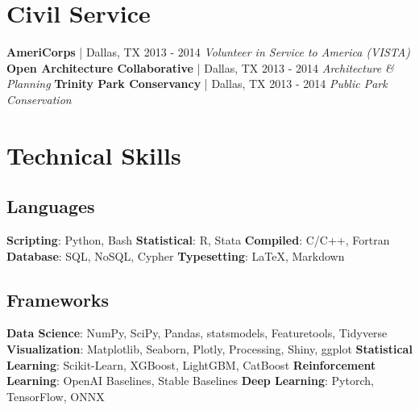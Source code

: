 \documentclass{article}
\begin{document}
    \section*{Civil Service}
        \textbf{AmeriCorps} | Dallas, TX \hfill{2013 - 2014}\newline
        \textit{Volunteer in Service to America (VISTA)}\newline\newline
        \textbf{Open Architecture Collaborative} | Dallas, TX \hfill{2013 - 2014}\newline
        \textit{Architecture \& Planning}\newline\newline
        \textbf{Trinity Park Conservancy} | Dallas, TX \hfill{2013 - 2014}\newline
        \textit{Public Park Conservation}
    \section*{Technical Skills}
    \subsection*{Languages}
        \textbf{Scripting}: Python, Bash\newline
        \textbf{Statistical}: R, Stata\newline
        \textbf{Compiled}: C/C++, Fortran\newline
        \textbf{Database}: SQL, NoSQL, Cypher\newline
        \textbf{Typesetting}: \LaTeX, Markdown
    \subsection*{Frameworks}
        \textbf{Data Science}: NumPy, SciPy, Pandas, statsmodels, Featuretools, Tidyverse\newline
        \textbf{Visualization}: Matplotlib, Seaborn, Plotly, Processing, Shiny, ggplot\newline
        \textbf{Statistical Learning}: Scikit-Learn, XGBoost, LightGBM, CatBoost\newline
        \textbf{Reinforcement Learning}: OpenAI Baselines, Stable Baselines\newline
        \textbf{Deep Learning}: Pytorch, TensorFlow, ONNX
\end{document}
